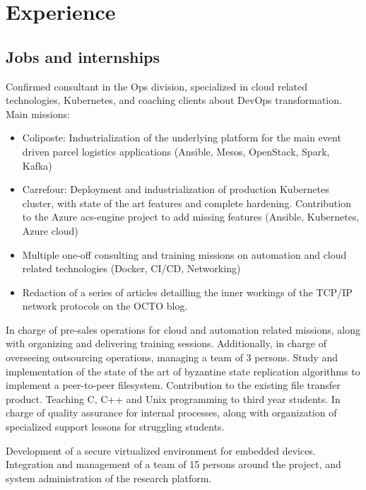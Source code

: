 \documentclass[10pt,a4paper,sans]{moderncv} %
\begin{document}
\section{Experience}

\subsection{Jobs and internships}

{Confirmed consultant in the Ops division, specialized in cloud related technologies, Kubernetes, and coaching clients about DevOps transformation.
\newline{}\newline{}
Main missions:
\begin{itemize}
\item Coliposte: Industrialization of the underlying platform for the main event driven parcel logistics applications (Ansible, Mesos, OpenStack, Spark, Kafka)
\item Carrefour: Deployment and industrialization of production Kubernetes cluster, with state of the art features and complete hardening. Contribution to the Azure acs-engine project to add missing features (Ansible, Kubernetes, Azure cloud)
\item Multiple one-off consulting and training missions on automation and cloud related technologies (Docker, CI/CD, Networking)
\item Redaction of a series of articles detailling the inner workings of the TCP/IP network protocols on the OCTO blog.
\end{itemize}}
{In charge of pre-sales operations for cloud and automation related missions, along with organizing and delivering training sessions. Additionally, in charge of overseeing outsourcing operations, managing a team of 3 persons.}
{Study and implementation of the state of the art of byzantine state replication algorithms to implement a peer-to-peer filesystem. Contribution to the existing file transfer product.}
{Teaching C, C++ and Unix programming to third year students. In charge of quality assurance for internal processes, along with organization of specialized support lessons for struggling students.}

{Development of a secure virtualized environment for embedded devices. Integration and management of a team of 15 persons around the project, and system administration of the research platform.}
\end{document}

